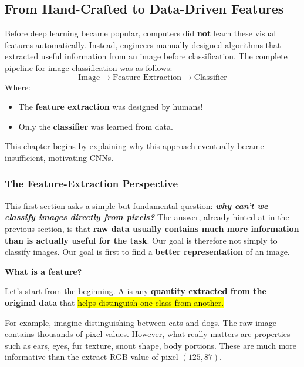 \subsection{From Hand-Crafted to Data-Driven Features}\label{sec:from-hand-crafted-to-data-driven-features}

Before deep learning became popular, computers did \textbf{not} learn these visual features automatically. Instead, engineers manually designed algorithms that extracted useful information from an image before classification. The complete pipeline for image classification was as follows:
\begin{equation*}
    \text{Image} \to \text{Feature Extraction} \to \text{Classifier}
\end{equation*}
Where:
\begin{itemize}
    \item The \textbf{feature extraction} was designed by humans!
    \item Only the \textbf{classifier} was learned from data.
\end{itemize}
This chapter begins by explaining why this approach eventually became insufficient, motivating CNNs.

\longline

\subsubsection{The Feature-Extraction Perspective}\label{sec:the-feature-extraction-perspective}

This first section asks a simple but fundamental question: \emph{\textbf{why can't we classify images directly from pixels?}} The answer, already hinted at in the previous section, is that \textbf{raw data usually contains much more information than is actually useful for the task}. Our goal is therefore not simply to classify images. Our goal is first to find a \textbf{better representation} of an image.

\highspace
\begin{flushleft}
    \textcolor{Green3}{ \textbf{What is a feature?}}
\end{flushleft}
Let's start from the beginning. A  is any \textbf{quantity extracted from the original data} that \hl{helps distinguish one class from another.}

\highspace
For example, imagine distinguishing between cats and dogs. The raw image contains thousands of pixel values. However, what really matters are properties such as ears, eyes, fur texture, snout shape, body portions. These are much more informative than the extract RGB value of pixel $\left(125, 87\right)$.

